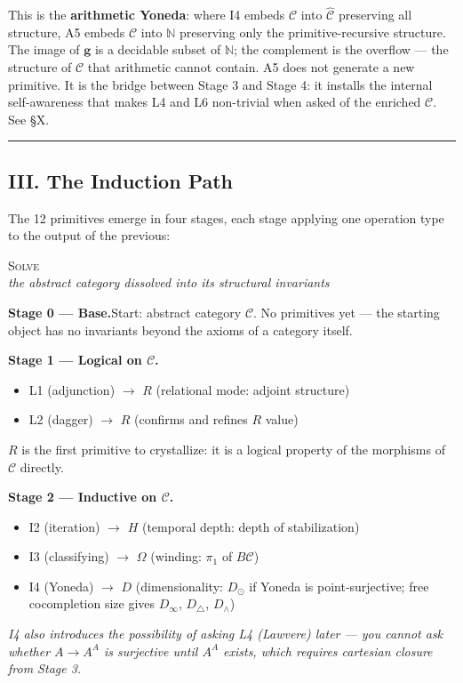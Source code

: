 \documentclass[12pt,a4paper]{article}
\newcommand{\pilcrow}{\S}
\begin{document}
This is the \textbf{arithmetic Yoneda}: where I4 embeds $\mathcal{C}$ into $\hat{\mathcal{C}}$ preserving all structure, A5 embeds $\mathcal{C}$ into $\mathbb{N}$ preserving only the primitive-recursive structure. The image of $\mathbf{g}$ is a decidable subset of $\mathbb{N}$; the complement is the overflow --- the structure of $\mathcal{C}$ that arithmetic cannot contain. A5 does not generate a new primitive. It is the bridge between Stage 3 and Stage 4: it installs the internal self-awareness that makes L4 and L6 non-trivial when asked of the enriched $\mathcal{C}$. See \pilcrow{}X.\begin{center}
\rule{0.5\textwidth}{0.4pt}
\end{center}

\subsection{III. The Induction Path}

The 12 primitives emerge in four stages, each stage applying one operation type to the output of the previous:

\begin{center}
\vspace{0.6em}
{\large\textsc{Solve}}\\[4pt]
{\small\itshape the abstract category dissolved into its structural invariants}
\vspace{0.4em}
\end{center}

\noindent\textbf{Stage 0 --- Base.}\quad Start: abstract category $\mathcal{C}$. No primitives yet --- the starting object has no invariants beyond the axioms of a category itself.

\medskip
\noindent\textbf{Stage 1 --- Logical on $\mathcal{C}$.}
\begin{itemize}[nosep, leftmargin=2em]
  \item L1 (adjunction) $\to$ $R$ (relational mode: adjoint structure)
  \item L2 (dagger) $\to$ $R$ (confirms and refines $R$ value)
\end{itemize}
$R$ is the first primitive to crystallize: it is a logical property of the morphisms of $\mathcal{C}$ directly.

\medskip
\noindent\textbf{Stage 2 --- Inductive on $\mathcal{C}$.}
\begin{itemize}[nosep, leftmargin=2em]
  \item I2 (iteration) $\to$ $H$ (temporal depth: depth of stabilization)
  \item I3 (classifying) $\to$ $\Omega$ (winding: $\pi_1$ of $B\mathcal{C}$)
  \item I4 (Yoneda) $\to$ $D$ (dimensionality: $D_\odot$ if Yoneda is point-surjective; free cocompletion size gives $D_\infty$, $D_\triangle$, $D_\wedge$)
\end{itemize}
{\small\itshape I4 also introduces the possibility of asking L4 (Lawvere) later --- you cannot ask whether $A \to A^A$ is surjective until $A^A$ exists, which requires cartesian closure from Stage 3.}
\end{document}
